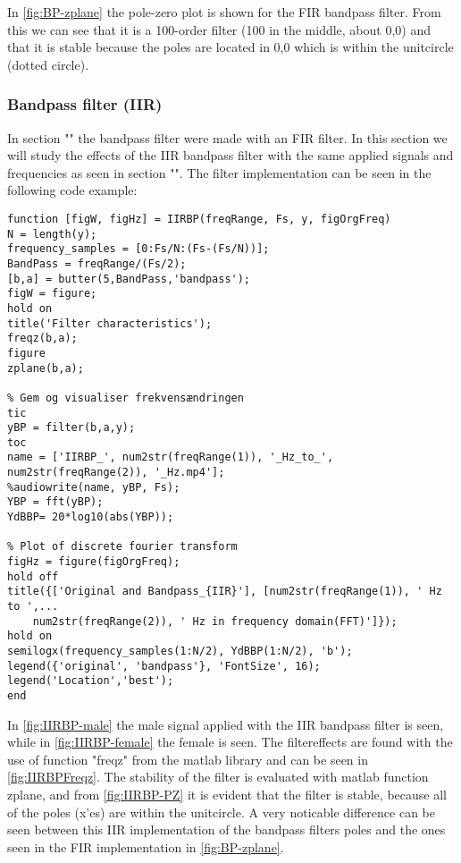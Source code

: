In \cref{fig:BP-zplane} the pole-zero plot is shown for the FIR bandpass filter. From this we can see that it is a 100-order filter (100 in the middle, about 0,0) and that it is stable because the poles are located in 0,0 which is within the unitcircle (dotted circle).  

\subsubsection{Bandpass filter (IIR)}
In section "" the bandpass filter were made with an FIR filter. In this section we will study the effects of the IIR bandpass filter with the same applied signals and frequencies as seen in section "". The filter implementation can be seen in the following code example:

\begin{verbatim}
function [figW, figHz] = IIRBP(freqRange, Fs, y, figOrgFreq)
N = length(y);
frequency_samples = [0:Fs/N:(Fs-(Fs/N))];
BandPass = freqRange/(Fs/2);
[b,a] = butter(5,BandPass,'bandpass');
figW = figure;
hold on
title('Filter characteristics');
freqz(b,a);
figure
zplane(b,a);

% Gem og visualiser frekvensændringen
tic
yBP = filter(b,a,y);
toc
name = ['IIRBP_', num2str(freqRange(1)), '_Hz_to_', num2str(freqRange(2)), '_Hz.mp4'];
%audiowrite(name, yBP, Fs);
YBP = fft(yBP);
YdBBP= 20*log10(abs(YBP));

% Plot of discrete fourier transform
figHz = figure(figOrgFreq);
hold off
title({['Original and Bandpass_{IIR}'], [num2str(freqRange(1)), ' Hz to ',...
	num2str(freqRange(2)), ' Hz in frequency domain(FFT)']});
hold on
semilogx(frequency_samples(1:N/2), YdBBP(1:N/2), 'b');
legend({'original', 'bandpass'}, 'FontSize', 16);
legend('Location','best');
end
\end{verbatim}

In \cref{fig:IIRBP-male} the male signal applied with the IIR bandpass filter is seen, while in \cref{fig:IIRBP-female} the female is seen. The filtereffects are found with the use of function "freqz" from the matlab library and can be seen in \cref{fig:IIRBPFreqz}. The stability of the filter is evaluated with matlab function zplane, and from \cref{fig:IIRBP-PZ} it is evident that the filter is stable, because all of the poles (x'es) are within the unitcircle. A very noticable difference can be seen between this IIR implementation of the bandpass filters poles and the ones seen in the FIR implementation in \cref{fig:BP-zplane}. 

